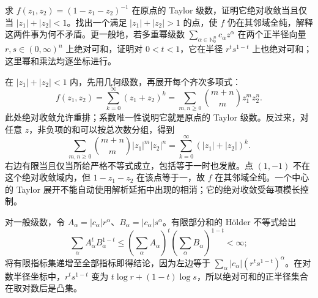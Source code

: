 \begin{exercise}[多重幂级数的收敛区域]\label{b3:ex:29-1}
求 \(f(z_1,z_2)=(1-z_1-z_2)^{-1}\) 在原点的 Taylor 级数，证明它绝对收敛当且仅当 \(|z_1|+|z_2|<1\)。找出一个满足 \(|z_1|+|z_2|>1\) 的点，使 \(f\) 仍在其邻域全纯，解释这两件事为何不矛盾。更一般地，若多重幂级数 \(\sum_{\alpha\in\mathbb N_0^n}c_\alpha z^\alpha\) 在两个正半径向量 \(r,s\in(0,\infty)^n\) 上绝对可和，证明对 \(0<t<1\)，它在半径 \(r^t s^{1-t}\) 上也绝对可和；这里幂和乘法均逐坐标进行。
\end{exercise}
\begin{solution}
在 \(|z_1|+|z_2|<1\) 内，先用几何级数，再展开每个齐次多项式：
\[
 f(z_1,z_2)=\sum_{k=0}^\infty(z_1+z_2)^k
 =\sum_{m,n\ge0}\binom{m+n}{m}z_1^m z_2^n.
\]
此处绝对收敛允许重排；系数唯一性说明它就是原点的 Taylor 级数。反过来，对任意 \(z\)，非负项的和可以按总次数分组，得到
\[
 \sum_{m,n\ge0}\binom{m+n}{m}|z_1|^m|z_2|^n
 =\sum_{k=0}^\infty(|z_1|+|z_2|)^k.
\]
右边有限当且仅当所给严格不等式成立，包括等于一时也发散。点 \((1,-1)\) 不在这个绝对收敛域内，但 \(1-z_1-z_2\) 在该点等于一，故 \(f\) 在其邻域全纯。一个中心的 Taylor 展开不能自动使用解析延拓中出现的相消；它的绝对收敛受每项模长控制。

对一般级数，令 \(A_\alpha=|c_\alpha|r^\alpha\)、\(B_\alpha=|c_\alpha|s^\alpha\)。有限部分和的 Hölder 不等式给出
\[
 \sum_\alpha A_\alpha^t B_\alpha^{1-t}
 \le\left(\sum_\alpha A_\alpha\right)^t
     \left(\sum_\alpha B_\alpha\right)^{1-t}<\infty;
\]
将有限指标集递增至全部指标即得结论，因为左边等于
\(\sum_\alpha|c_\alpha|(r^t s^{1-t})^\alpha\)。在对数半径坐标中，\(r^t s^{1-t}\) 变为 \(t\log r+(1-t)\log s\)，所以绝对可和的正半径集合在取对数后是凸集。
\end{solution}

